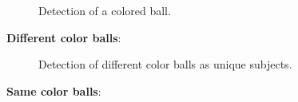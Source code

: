 \documentclass{sciposter}
\begin{document}
\begin{multicols}{3}
\begin{figure}[!h]
	\centering
			\setlength{\fboxsep}{1pt}
			\setlength{\fboxrule}{1pt}
	\caption{Detection of a colored ball.}
	\label{fig:single_color}
\end{figure}

\textbf{Different color balls}:

\begin{figure}[!h]
	\centering
			\setlength{\fboxsep}{1pt}
			\setlength{\fboxrule}{1pt}
	\caption{Detection of different color balls as unique subjects.}
	\label{fig:diff_color}
\end{figure}

\textbf{Same color balls}:


\end{multicols}
\end{document}
